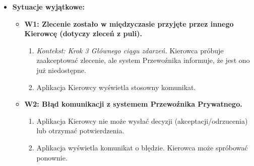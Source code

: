 \documentclass[a4paper,12pt]{article}
\begin{document}
\begin{itemize}
\begin{itemize}
        \end{itemize}
    \item \textbf{Sytuacje wyjątkowe:}
        \begin{itemize}
            \item \textbf{W1: Zlecenie zostało w międzyczasie przyjęte przez innego Kierowcę (dotyczy zleceń z puli).}
                \begin{enumerate}
                    \item \textit{Kontekst: Krok 3 Głównego ciągu zdarzeń.} Kierowca próbuje zaakceptować zlecenie, ale system Przewoźnika informuje, że jest ono już niedostępne.
                    \item Aplikacja Kierowcy wyświetla stosowny komunikat.
                \end{enumerate}
            \item \textbf{W2: Błąd komunikacji z systemem Przewoźnika Prywatnego.}
                \begin{enumerate}
                    \item Aplikacja Kierowcy nie może wysłać decyzji (akceptacji/odrzucenia) lub otrzymać potwierdzenia.
                    \item Aplikacja wyświetla komunikat o błędzie. Kierowca może spróbować ponownie.
                \end{enumerate}
        \end{itemize}
\end{itemize}
\end{document}

